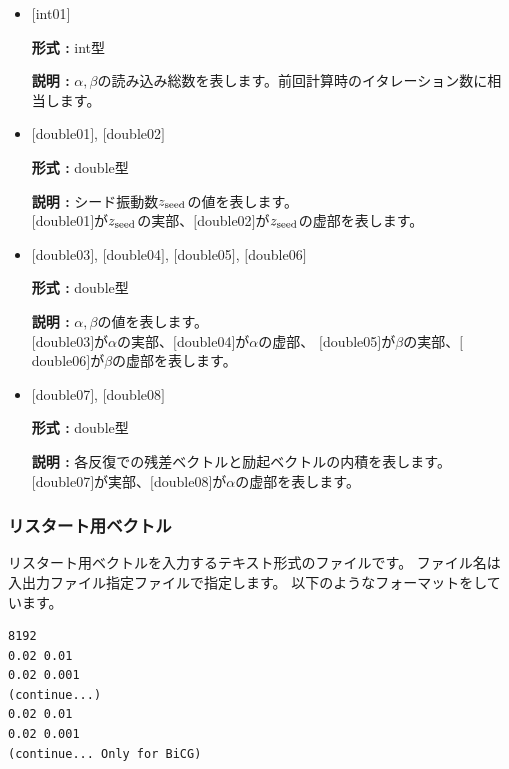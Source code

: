 \documentclass[12pt,titlepage]{jarticle}
\begin{document}
\begin{itemize}

\item  $[$int01$]$

  {\bf 形式 :} int型

  {\bf 説明 :} $\alpha, \beta$の読み込み総数を表します。前回計算時のイタレーション数に相当します。
 
\item  $[$double01$]$, $[$double02$]$

  {\bf 形式 :} double型 

  {\bf 説明 :} シード振動数$z_{\rm seed}$の値を表します。\\
  $[$double01$]$が$z_{\rm seed}$の実部、$[$double02$]$が$z_{\rm seed}$の虚部を表します。\\

\item  $[$double03$]$, $[$double04$]$, $[$double05$]$, $[$double06$]$

  {\bf 形式 :} double型 

  {\bf 説明 :} $\alpha, \beta$の値を表します。\\
  $[$double03$]$が$\alpha$の実部、$[$double04$]$が$\alpha$の虚部、
  $[$double05$]$が$\beta$の実部、$[$double06$]$が$\beta$の虚部を表します。\\

\item  $[$double07$]$, $[$double08$]$

  {\bf 形式 :} double型 

  {\bf 説明 :} 各反復での残差ベクトルと励起ベクトルの内積を表します。\\
  $[$double07$]$が実部、$[$double08$]$が$\alpha$の虚部を表します。\\

\end{itemize}


\newpage
\subsubsection{リスタート用ベクトル}\label{subsubsec:revec}
リスタート用ベクトルを入力するテキスト形式のファイルです。
ファイル名は入出力ファイル指定ファイルで指定します。
以下のようなフォーマットをしています。
\\
\begin{minipage}{10cm}
\begin{screen}
\begin{verbatim}
8192
0.02 0.01
0.02 0.001
(continue...)
0.02 0.01
0.02 0.001
(continue... Only for BiCG)
\end{verbatim}
\end{screen}
\end{minipage}
\end{document}
